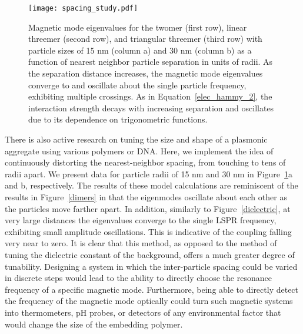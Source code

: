 \documentclass[journal=apchd5,manuscript=article]{achemso}
\begin{document}
\begin{figure}
\centering
\texttt{[image: spacing\_study.pdf]}
\caption{Magnetic mode eigenvalues for the twomer (first row), linear threemer (second row), and triangular threemer (third row) with particle sizes of 15 nm (column a) and 30 nm (column b) as a function of nearest neighbor particle separation in units of radii. As the separation distance increases, the magnetic mode eigenvalues converge to and oscillate about the single particle frequency, exhibiting multiple crossings. As in Equation~\ref{elec_hammy_2}, the interaction strength decays with increasing separation and oscillates due to its dependence on trigonometric functions.}
\label{spacing}
\end{figure}

There is also active research on tuning the size and shape of a plasmonic aggregate using various polymers\cite{Ginger2017} or DNA\cite{DanLuo2009,NaLiu2017}. Here, we implement the idea of continuously distorting the nearest-neighbor spacing, from touching to tens of radii apart. We present data for particle radii of 15 nm and 30 nm in Figure~\ref{spacing}a and b, respectively. The results of these model calculations are reminiscent of the results in Figure~\ref{dimers} in that the eigenmodes oscillate about each other as the particles move farther apart. In addition, similarly to Figure~\ref{dielectric}, at very large distances the eigenvalues converge to the single LSPR frequency, exhibiting small amplitude oscillations. This is indicative of the coupling falling very near to zero. It is clear that this method, as opposed to the method of tuning the dielectric constant of the background, offers a much greater degree of tunability. Designing a system in which the inter-particle spacing could be varied in discrete steps would lead to the ability to directly choose the resonance frequency of a specific magnetic mode. Furthermore, being able to directly detect the frequency of the magnetic mode optically could turn such magnetic systems into thermometers, pH probes, or detectors of any environmental factor that would change the size of the embedding polymer.

\end{document}
